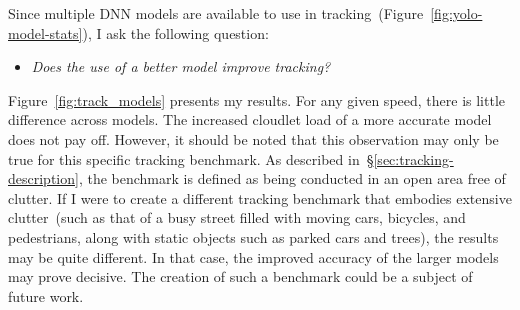 Since multiple DNN models are available to use in
tracking~(Figure~\ref{fig:yolo-model-stats}), I ask the following
question:
\begin{itemize}
\item{\em Does the use of a better model improve tracking?}
\end{itemize}
Figure~\ref{fig:track_models} presents my results.  For any given
speed, there is little difference across models.  The increased
cloudlet load of a more accurate model does not pay off.  However, it
should be noted that this observation may only be true for this
specific tracking benchmark.  As described
in~\S\ref{sec:tracking-description}, the benchmark is defined as being
conducted in an open area free of clutter.  If I were to create a
different tracking benchmark that embodies extensive clutter~(such as
that of a busy street filled with moving cars, bicycles, and
pedestrians, along with static objects such as parked cars and trees),
the results may be quite different. In that case, the improved
accuracy of the larger models may prove decisive. The creation of such a benchmark could be a subject of future work.

